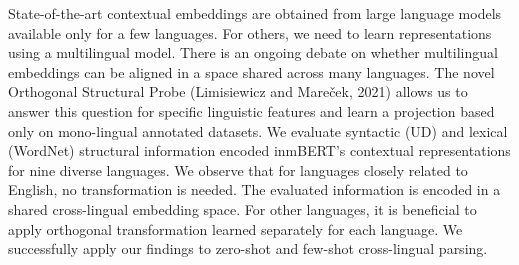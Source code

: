State-of-the-art contextual embeddings are obtained from large language models available only for a few languages. For others, we need to learn representations using a multilingual model. There is an ongoing debate on whether multilingual embeddings can be aligned in a space shared across many languages. The novel Orthogonal Structural Probe (Limisiewicz and Mareček, 2021) allows us to answer this question for specific linguistic features and learn a projection based only on mono-lingual annotated datasets. We evaluate syntactic (UD) and lexical (WordNet) structural information encoded inmBERT's contextual representations for nine diverse languages. We observe that for languages closely related to English, no transformation is needed. The evaluated information is encoded in a shared cross-lingual embedding space. For other languages, it is beneficial to apply orthogonal transformation learned separately for each language. We successfully apply our findings to zero-shot and few-shot cross-lingual parsing.
